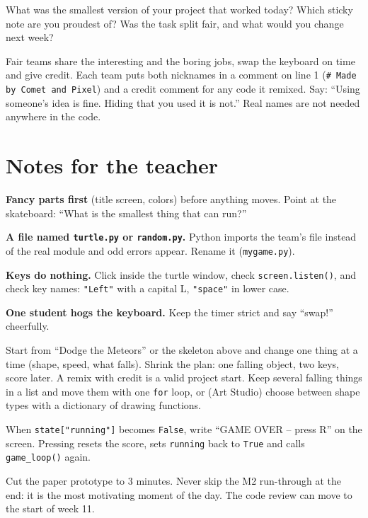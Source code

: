 \begin{reflection}
What was the smallest version of your project that worked today? Which sticky note are you proudest
of? Was the task split fair, and what would you change next week?
\end{reflection}

\begin{safety}
Fair teams share the interesting and the boring jobs, swap the keyboard on time and give credit.
Each team puts both nicknames in a comment on line 1 (\texttt{\# Made by Comet and Pixel}) and a
credit comment for any code it remixed. Say: \enquote{Using someone's idea is fine. Hiding that you
used it is not.} Real names are not needed anywhere in the code.
\end{safety}

\section{Notes for the teacher}
\begin{commonmistakes}
  \item \textbf{Fancy parts first} (title screen, colors) before anything moves. Point at the skateboard: \enquote{What is the smallest thing that can run?}
  \item \textbf{A file named \texttt{turtle.py} or \texttt{random.py}.} Python imports the team's file instead of the real module and odd errors appear. Rename it (\texttt{mygame.py}).
  \item \textbf{Keys do nothing.} Click inside the turtle window, check \texttt{screen.listen()}, and check key names: \texttt{"Left"} with a capital L, \texttt{"space"} in lower case.
  \item \textbf{One student hogs the keyboard.} Keep the timer strict and say \enquote{swap!} cheerfully.
\end{commonmistakes}

\begin{differentiation}
\supportpath Start from \enquote{Dodge the Meteors} or the skeleton above and change one thing at a
time (shape, speed, what falls). Shrink the plan: one falling object, two keys, score later. A remix
with credit is a valid project start.
\extensionpath Keep several falling things in a list and move them with one \texttt{for} loop, or
(Art Studio) choose between shape types with a dictionary of drawing functions.
\end{differentiation}

\begin{stretchchallenge}
When \texttt{state["running"]} becomes \texttt{False}, write \enquote{GAME OVER -- press R} on the
screen. Pressing  resets the score, sets \texttt{running} back to \texttt{True} and calls
\texttt{game\_loop()} again.
\end{stretchchallenge}

\begin{teachernote}
Cut the paper prototype to 3 minutes. Never skip the M2 run-through at the end: it is the most
motivating moment of the day. The code review can move to the start of week 11.
\end{teachernote}
